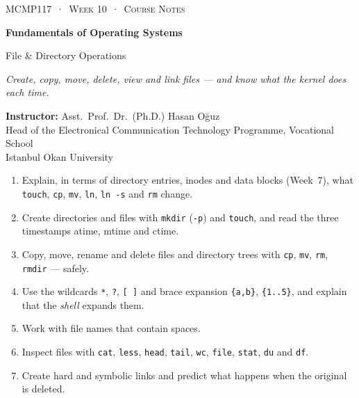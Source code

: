 \documentclass[11pt,a4paper]{article}
\newcommand{\cmd}[1]{\texttt{#1}}
\begin{document}
\setlength{\parskip}{0.45em}
\thispagestyle{empty}
\begin{tcolorbox}[enhanced,colback=dark,colframe=dark,arc=0pt,boxrule=0pt,
  left=18pt,right=18pt,top=20pt,bottom=20pt,coltext=white]
{\small\color{mint}\textsc{MCMP117 \,·\, Week 10 \,·\, Course Notes}}\par\medskip
{\headfont\fontsize{26}{30}\selectfont\bfseries Fundamentals of Operating Systems}\par\medskip
{\large File \& Directory Operations}\par\smallskip
{\small\itshape\color{white!70} Create, copy, move, delete, view and link files --- and know what the kernel does each time.}
\end{tcolorbox}

\vspace{0.4em}
{\small
\textbf{Instructor:} Asst.\ Prof.\ Dr.\ (Ph.D.) Hasan Oğuz\\
Head of the Electronical Communication Technology Programme, Vocational School\\
Istanbul Okan University\par}

\vspace{0.8em}
\begin{keyidea}
\begin{enumerate}[leftmargin=1.4em]
  \item Explain, in terms of directory entries, inodes and data blocks (Week~7), what \cmd{touch}, \cmd{cp}, \cmd{mv}, \cmd{ln}, \cmd{ln -s} and \cmd{rm} change.
  \item Create directories and files with \cmd{mkdir} (\cmd{-p}) and \cmd{touch}, and read the three timestamps atime, mtime and ctime.
  \item Copy, move, rename and delete files and directory trees with \cmd{cp}, \cmd{mv}, \cmd{rm}, \cmd{rmdir} --- safely.
  \item Use the wildcards \texttt{*}, \texttt{?}, \texttt{[\,]} and brace expansion \texttt{\{a,b\}}, \texttt{\{1..5\}}, and explain that the \emph{shell} expands them.
  \item Work with file names that contain spaces.
  \item Inspect files with \cmd{cat}, \cmd{less}, \cmd{head}, \cmd{tail}, \cmd{wc}, \cmd{file}, \cmd{stat}, \cmd{du} and \cmd{df}.
  \item Create hard and symbolic links and predict what happens when the original is deleted.
\end{enumerate}
\end{keyidea}
\end{document}
